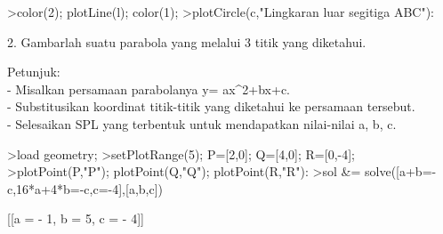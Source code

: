 \documentclass[a4paper,10pt]{article}
\begin{document}
\begin{eulernotebook}
\begin{eulercomment}
\begin{eulercomment}
\begin{eulercomment}
\begin{eulercomment}
\begin{eulercomment}
\begin{eulercomment}
\begin{eulercomment}
\begin{eulercomment}
\begin{eulercomment}
\begin{eulercomment}
\begin{eulercomment}
\begin{eulercomment}
\begin{eulercomment}
\begin{eulercomment}
\begin{eulercomment}
\begin{eulercomment}
\begin{eulercomment}
\begin{eulercomment}
\begin{eulercomment}
\begin{eulercomment}
\begin{eulercomment}
\begin{eulercomment}
\begin{eulercomment}
\begin{eulercomment}
\begin{eulercomment}
\begin{eulercomment}
\begin{eulercomment}
\begin{eulercomment}
\begin{eulercomment}
\begin{eulercomment}
\begin{eulercomment}
\begin{eulercomment}
\begin{eulercomment}
\begin{eulercomment}
\begin{eulercomment}
\begin{eulercomment}
\begin{eulercomment}
\begin{eulercomment}
\begin{eulercomment}
\begin{eulercomment}
\begin{eulercomment}
\begin{eulercomment}
\begin{eulerprompt}
>color(2); plotLine(l); color(1);
>plotCircle(c,"Lingkaran luar segitiga ABC"):
\end{eulerprompt}
\begin{eulercomment}
2. Gambarlah suatu parabola yang melalui 3 titik yang diketahui.

Petunjuk:\\
- Misalkan persamaan parabolanya y= ax\textasciicircum{}2+bx+c.\\
- Substitusikan koordinat titik-titik yang diketahui ke persamaan
tersebut.\\
- Selesaikan SPL yang terbentuk untuk mendapatkan nilai-nilai a, b, c.
\end{eulercomment}
\begin{eulerprompt}
>load geometry;
>setPlotRange(5); P=[2,0]; Q=[4,0]; R=[0,-4];
>plotPoint(P,"P"); plotPoint(Q,"Q"); plotPoint(R,"R"):
>sol &= solve([a+b=-c,16*a+4*b=-c,c=-4],[a,b,c])
\end{eulerprompt}
\begin{euleroutput}
  
                       [[a = - 1, b = 5, c = - 4]]
  

\end{euleroutput}
\end{eulercomment}
\end{eulercomment}
\end{eulercomment}
\end{eulercomment}
\end{eulercomment}
\end{eulercomment}
\end{eulercomment}
\end{eulercomment}
\end{eulercomment}
\end{eulercomment}
\end{eulercomment}
\end{eulercomment}
\end{eulercomment}
\end{eulercomment}
\end{eulercomment}
\end{eulercomment}
\end{eulercomment}
\end{eulercomment}
\end{eulercomment}
\end{eulercomment}
\end{eulercomment}
\end{eulercomment}
\end{eulercomment}
\end{eulercomment}
\end{eulercomment}
\end{eulercomment}
\end{eulercomment}
\end{eulercomment}
\end{eulercomment}
\end{eulercomment}
\end{eulercomment}
\end{eulercomment}
\end{eulercomment}
\end{eulercomment}
\end{eulercomment}
\end{eulercomment}
\end{eulercomment}
\end{eulercomment}
\end{eulercomment}
\end{eulercomment}
\end{eulercomment}
\end{eulercomment}
\end{eulernotebook}
\end{document}

